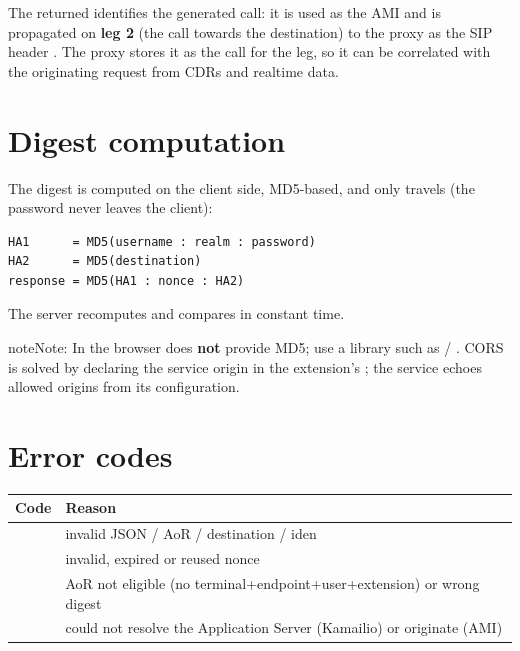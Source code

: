 \documentclass[letterpaper,10pt,english]{sphinxmanual}
\begin{document}
The returned  identifies the generated call: it is used as the AMI
 and is propagated on \textbf{leg 2} (the call towards the destination) to
the proxy as the SIP header . The proxy stores it as the
call  for the leg, so it can be correlated with the originating 
request from CDRs and realtime data.


\section{Digest computation}
\label{api_rest/click2call:digest-computation}
The digest is computed on the client side, MD5-based, and only 
travels (the password never leaves the client):

\begin{Verbatim}[commandchars=\\\{\}]
HA1      = MD5(username : realm : password)
HA2      = MD5(destination)
response = MD5(HA1 : nonce : HA2)
\end{Verbatim}

The server recomputes and compares in constant time.

\begin{notice}{note}{Note:}
In the browser  does \textbf{not} provide MD5; use a library such as
 / . CORS is solved by declaring the service origin in
the extension's ; the service echoes allowed origins from its
configuration.
\end{notice}


\section{Error codes}
\label{api_rest/click2call:error-codes}
\noindent\begin{tabulary}{\linewidth}{|L|L|}
\hline
\textsf{\relax 
Code
\unskip}\relax &\textsf{\relax 
Reason
\unskip}\relax \\
\hline
{}
&
invalid JSON / AoR / destination / iden
\\
\hline
{}
&
invalid, expired or reused nonce
\\
\hline
{}
&
AoR not eligible (no terminal+endpoint+user+extension) or wrong digest
\\
\hline
{}
&
could not resolve the Application Server (Kamailio) or originate (AMI)
\\
\hline\end{tabulary}
\end{document}
